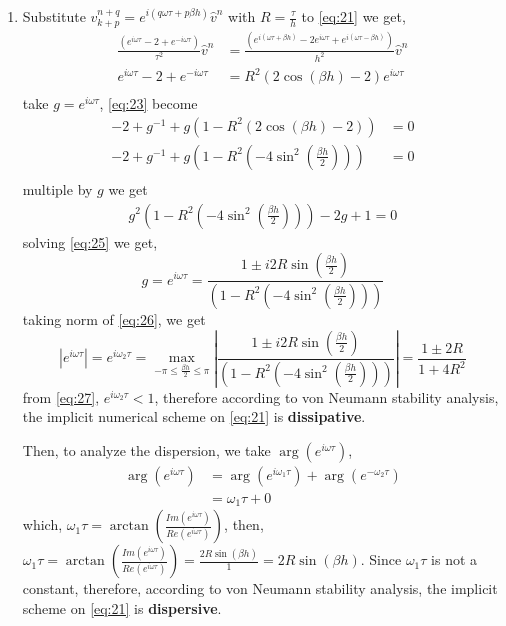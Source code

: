 \documentclass[a4paper,12pt]{article}
\begin{document}
\begin{enumerate}
	\item Substitute $v_{k+p}^{n+q} = e^{i(q\omega\tau + p\beta h)}\hat{v}^n$ with $R=\frac{\tau}{h}$ to \eqref{eq:21} we get,
	\begin{equation}\label{eq:23}
	\begin{aligned}
	\frac{(e^{i\omega\tau} -2 + e^{-i\omega\tau})}{\tau^2}\hat{v}^n &= \frac{(e^{i(\omega\tau+\beta h)}-2e^{i\omega\tau}+e^{i(\omega\tau-\beta h)})}{h^2}\hat{v}^n\\
	e^{i\omega\tau} -2 + e^{-i\omega\tau} &= R^2(2\cos(\beta h)-2)e^{i\omega\tau}\\
	\end{aligned}
	\end{equation}
	take $g=e^{i\omega\tau}$, \eqref{eq:23} become
	\begin{equation}
	\begin{aligned}
	-2 + g^{-1} + g\left(1 - R^2(2\cos(\beta h)-2)\right) &= 0\\
	-2 + g^{-1} + g\left(1 - R^2(-4\sin^2(\frac{\beta h}{2}))\right) &= 0\\
	\end{aligned}
	\end{equation}
	multiple by $g$ we get
	\begin{equation}\label{eq:25}
	\begin{aligned}
	g^2(1-R^2(-4\sin^2(\frac{\beta h}{2}))) -2g + 1 = 0
	\end{aligned}
	\end{equation}
	solving \eqref{eq:25} we get,
	\begin{equation}\label{eq:26}
	g = e^{i\omega\tau} = \frac{1\pm i2R\sin(\frac{\beta h}{2})}{(1-R^2(-4\sin^2(\frac{\beta h}{2})))}
	\end{equation}
	taking norm of \eqref{eq:26}, we get
	\begin{equation}\label{eq:27}
	|e^{i\omega\tau}| = e^{i\omega_2\tau} = \max_{-\pi \leq \frac{\beta h}{2} \leq \pi} \left| \frac{1\pm i2R\sin(\frac{\beta h}{2})}{(1-R^2(-4\sin^2(\frac{\beta h}{2})))} \right| = \frac{1\pm 2R}{1+4R^2}
	\end{equation}
	from \eqref{eq:27}, $e^{i\omega_2\tau} < 1$, therefore according to von Neumann stability analysis, the implicit numerical scheme on \eqref{eq:21} is \textbf{dissipative}.
	
	Then, to analyze the dispersion, we take $\arg(e^{i\omega\tau})$,
	\begin{equation}\label{eq:28}
	\begin{aligned}
	\arg(e^{i\omega\tau}) &= \arg(e^{i\omega_1\tau}) + \arg(e^{-\omega_2\tau})\\
	&= \omega_1\tau + 0
	\end{aligned}
	\end{equation}
	which, $\omega_1\tau = \arctan\left(\frac{Im(e^{i\omega \tau})}{Re(e^{i\omega \tau})}\right)$,
	then, $\omega_1\tau = \arctan\left(\frac{Im(e^{i\omega \tau})}{Re(e^{i\omega \tau})}\right) = \frac{2R\sin(\beta h)}{1}=2R\sin(\beta h)$. Since $\omega_1\tau$ is not a constant, therefore, according to von Neumann stability analysis, the implicit scheme on \eqref{eq:21} is \textbf{dispersive}.
	

\end{enumerate}
\end{document}
